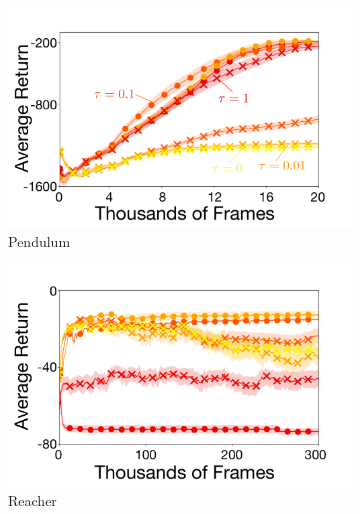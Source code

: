 \documentclass{article}
\begin{document}

\begin{figure}[t]
  \centering
  \begin{subfigure}[b]{0.33\linewidth}
    \centering
    \includegraphics[width=\columnwidth]{figs/deep/continuous/PD_entropy_comparison.pdf} 
    \caption{Pendulum}\label{fig:pendulum}
  \end{subfigure}%
  \begin{subfigure}[b]{0.33\linewidth}
    \centering
    \includegraphics[width=\columnwidth]{figs/deep/continuous/Reacher_entropy_comparison.pdf} 
    \caption{Reacher}\label{fig:reacher}
  \end{subfigure}%
  \begin{subfigure}[b]{0.33\linewidth}

\end{subfigure}
\end{figure}
\end{document}
